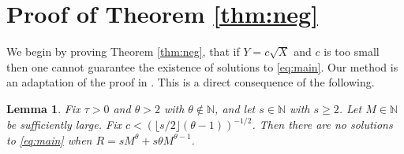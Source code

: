 \documentclass[11pt,reqno]{amsart}
\numberwithin{equation}{section}
\newtheorem{lemma}{Lemma}[section]
\begin{document}
\section{Proof of Theorem \ref{thm:neg}} \label{sec:neg}

We begin by proving Theorem \ref{thm:neg}, that if $Y = c\sqrt{X}$ and $c$ is too small then one cannot guarantee the existence of solutions to \eqref{eq:main}. Our method is an adaptation of the proof in \cite{Wright1}. This is a direct consequence of the following. 

\begin{lemma} Fix $\tau > 0$ and $\theta > 2$ with $\theta \notin \mathbb{N}$, and let $s \in \mathbb{N}$ with $s \geq 2$. Let $M \in \mathbb{N}$ be sufficiently large. Fix $c < (\lfloor s/2 \rfloor (\theta-1))^{-1/2} $. Then there are no solutions to \eqref{eq:main} when $R = sM^{\theta}+s\theta M^{\theta-1}$. 
\end{lemma} 
\end{document}
